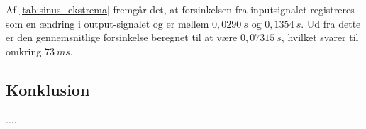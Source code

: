 Af \autoref{tab:sinus_ekstrema} fremgår det, at forsinkelsen fra inputsignalet registreres som en ændring  i output-signalet og er mellem $0,0290~s$ og $0,1354~s$. Ud fra dette er den gennemsnitlige forsinkelse beregnet til at være $0,07315~s$, hvilket svarer til omkring $73~ms$. 


\subsection{Konklusion}
.....